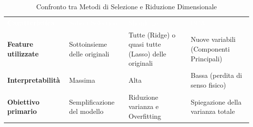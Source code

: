 \begin{table}[ht]
	\centering
	\renewcommand{\arraystretch}{1.6} %
	\begin{tabularx}{\textwidth}{>{\bfseries}l XXX}
		\rowcolor{tableHeader}
		\textcolor{white}{Caratteristica} & \textcolor{white}{Subset Selection} & \textcolor{white}{Shrinkage} & \textcolor{white}{PCA} \\
		
		Feature utilizzate & Sottoinsieme delle originali & Tutte (Ridge) o quasi tutte (Lasso) delle originali & Nuove variabili (Componenti Principali) \\
		
		\rowcolor{rowEven}
		Interpretabilità & Massima & Alta & Bassa (perdita di senso fisico) \\
		
		Obiettivo primario & Semplificazione del modello & Riduzione varianza e Overfitting & Spiegazione della varianza totale \\
		
		\bottomrule
	\end{tabularx}
	\caption{Confronto tra Metodi di Selezione e Riduzione Dimensionale}
\end{table}